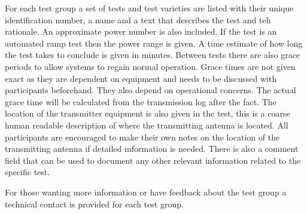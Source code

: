 \documentclass[a4paper]{book}
\begin{document}
For each test group a set of tests and test varieties are listed with their unique identification number, a name and a text that describes the test and teh rationale. An approximate power number is also included. If the test is an automated ramp test then the power range is given. A time estimate of how long the test takes to conclude is given in minutes. Between tests there are also grace periods to allow systems to regain normal operation. Grace  times are not given exact as they are dependent on equipment and needs to be discussed with participants beforehand. They also depend on operational concerns. The actual grace time will be calculated from the transmission log after the fact. The location of the transmitter equipment is also given in the test, this is a coarse human readable description of where the transmitting antenna is located. All participants are encouraged to make their own notes on the location of the transmitting antenna if detailed information is needed. There is also a comment field that can be used to document any other relevant information related to the specific test. \newline

For those wanting more information or have feedback about the test group a technical contact is provided for each test group. 


%
\end{document}

